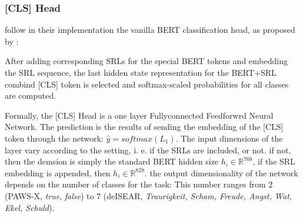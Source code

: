 \subsubsection{[CLS] Head}

\cite{zhang2019semantics} follow in their implementation the vanilla BERT classification
head, as proposed by \cite{devlin2018bert}:

After adding corresponding SRLs for the special BERT tokens and embedding the SRL sequence,
the last hidden state representation for the BERT+SRL combind [CLS] token is selected
and softmax-scaled probabilities for all classes are computed.



Formally, the [CLS] Head is a one layer Fullyconnected Feedforwrd Neural Network. The
prediction is the results of sending the embedding of the [CLS] token through the network:
$\hat{y} = softmax(L_1)$. The input dimensions of the layer vary according to the setting,
i. e. if the SRLs are included, or not. if not, then the demsion is simply the standard
BERT hidden size $h_i \in \mathbb{R}^{768}$, if the SRL embedding is appended, then $h_i \in
\mathbb{R}^{828}$. the output dimensionality of the network depends on the number of classes
for the task: This number ranges from 2 (PAWS-X, \emph{true}, \emph{false}) to 7 (deISEAR,
\emph{Traurigkeit, Scham, Freude, Angst, Wut, Ekel, Schuld}).



